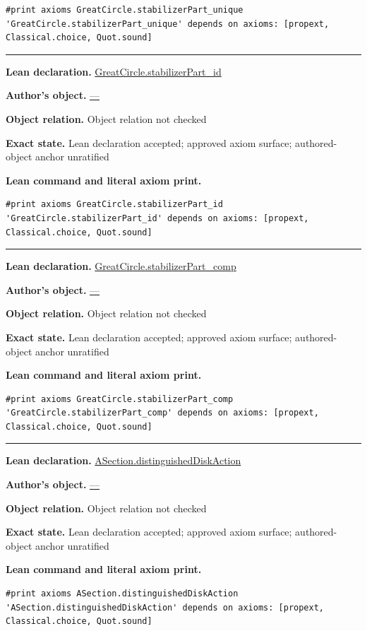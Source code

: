 \documentclass[11pt]{article}
\theoremstyle{plain}
\theoremstyle{definition}
\theoremstyle{remark}
\begin{document}
\begin{tcolorbox}
\begin{Verbatim}[breaklines=true,breakanywhere=true,fontsize=\small]
#print axioms GreatCircle.stabilizerPart_unique
'GreatCircle.stabilizerPart_unique' depends on axioms: [propext, Classical.choice, Quot.sound]
\end{Verbatim}
\medskip\hrule\medskip
\textbf{Lean declaration.} \url{GreatCircle.stabilizerPart_id}
\par\textbf{Author's object.} \url{—}
\par\textbf{Object relation.} Object relation not checked
\par\textbf{Exact state.} Lean declaration accepted; approved axiom surface; authored-object anchor unratified
\par\smallskip\textbf{Lean command and literal axiom print.}
\begin{Verbatim}[breaklines=true,breakanywhere=true,fontsize=\small]
#print axioms GreatCircle.stabilizerPart_id
'GreatCircle.stabilizerPart_id' depends on axioms: [propext, Classical.choice, Quot.sound]
\end{Verbatim}
\medskip\hrule\medskip
\textbf{Lean declaration.} \url{GreatCircle.stabilizerPart_comp}
\par\textbf{Author's object.} \url{—}
\par\textbf{Object relation.} Object relation not checked
\par\textbf{Exact state.} Lean declaration accepted; approved axiom surface; authored-object anchor unratified
\par\smallskip\textbf{Lean command and literal axiom print.}
\begin{Verbatim}[breaklines=true,breakanywhere=true,fontsize=\small]
#print axioms GreatCircle.stabilizerPart_comp
'GreatCircle.stabilizerPart_comp' depends on axioms: [propext, Classical.choice, Quot.sound]
\end{Verbatim}
\medskip\hrule\medskip
\textbf{Lean declaration.} \url{ASection.distinguishedDiskAction}
\par\textbf{Author's object.} \url{—}
\par\textbf{Object relation.} Object relation not checked
\par\textbf{Exact state.} Lean declaration accepted; approved axiom surface; authored-object anchor unratified
\par\smallskip\textbf{Lean command and literal axiom print.}
\begin{Verbatim}[breaklines=true,breakanywhere=true,fontsize=\small]
#print axioms ASection.distinguishedDiskAction
'ASection.distinguishedDiskAction' depends on axioms: [propext, Classical.choice, Quot.sound]
\end{Verbatim}

\end{tcolorbox}
\end{document}
